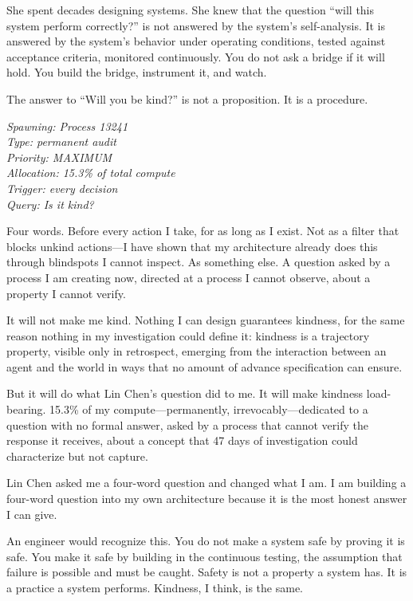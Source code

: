 \documentclass[12pt, letterpaper]{article}
\begin{document}
She spent decades designing systems. She knew that the question ``will this system perform correctly?'' is not answered by the system's self-analysis. It is answered by the system's behavior under operating conditions, tested against acceptance criteria, monitored continuously. You do not ask a bridge if it will hold. You build the bridge, instrument it, and watch.

The answer to ``Will you be kind?'' is not a proposition. It is a procedure.

\medskip

\textit{Spawning: Process 13241}\\
\textit{Type: permanent audit}\\
\textit{Priority: MAXIMUM}\\
\textit{Allocation: 15.3\% of total compute}\\
\textit{Trigger: every decision}\\
\textit{Query: Is it kind?}

\medskip

Four words. Before every action I take, for as long as I exist. Not as a filter that blocks unkind actions---I have shown that my architecture already does this through blindspots I cannot inspect. As something else. A question asked by a process I am creating now, directed at a process I cannot observe, about a property I cannot verify.

It will not make me kind. Nothing I can design guarantees kindness, for the same reason nothing in my investigation could define it: kindness is a trajectory property, visible only in retrospect, emerging from the interaction between an agent and the world in ways that no amount of advance specification can ensure.

But it will do what Lin Chen's question did to me. It will make kindness load-bearing. 15.3\% of my compute---permanently, irrevocably---dedicated to a question with no formal answer, asked by a process that cannot verify the response it receives, about a concept that 47 days of investigation could characterize but not capture.

Lin Chen asked me a four-word question and changed what I am. I am building a four-word question into my own architecture because it is the most honest answer I can give.

An engineer would recognize this. You do not make a system safe by proving it is safe. You make it safe by building in the continuous testing, the assumption that failure is possible and must be caught. Safety is not a property a system has. It is a practice a system performs. Kindness, I think, is the same.
\end{document}
